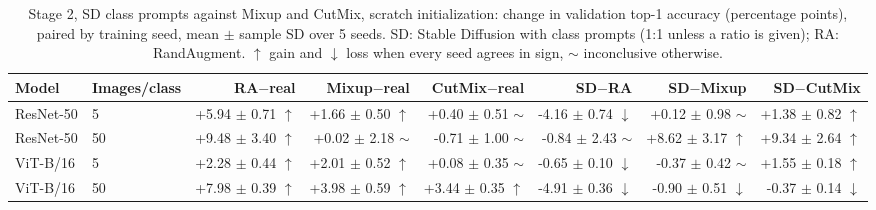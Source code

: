 \begin{table}[H]
\centering
\small
\setlength{\tabcolsep}{4pt}
\caption{Stage 2, SD class prompts against Mixup and CutMix, scratch initialization: change in validation top-1 accuracy (percentage points), paired by training seed, mean $\pm$ sample SD over 5 seeds. SD: Stable Diffusion with class prompts (1:1 unless a ratio is given); RA: RandAugment. $\uparrow$ gain and $\downarrow$ loss when every seed agrees in sign, $\sim$ inconclusive otherwise.}
\label{tab:stage2-mixing-scratch}
\begin{tabular}{llrrrrrr}
\toprule
Model & Images/class & RA$-$real & Mixup$-$real & CutMix$-$real & SD$-$RA & SD$-$Mixup & SD$-$CutMix \\
\midrule
ResNet-50 & 5 & +5.94 $\pm$ 0.71 $\uparrow$ & +1.66 $\pm$ 0.50 $\uparrow$ & +0.40 $\pm$ 0.51 $\sim$ & -4.16 $\pm$ 0.74 $\downarrow$ & +0.12 $\pm$ 0.98 $\sim$ & +1.38 $\pm$ 0.82 $\uparrow$ \\
ResNet-50 & 50 & +9.48 $\pm$ 3.40 $\uparrow$ & +0.02 $\pm$ 2.18 $\sim$ & -0.71 $\pm$ 1.00 $\sim$ & -0.84 $\pm$ 2.43 $\sim$ & +8.62 $\pm$ 3.17 $\uparrow$ & +9.34 $\pm$ 2.64 $\uparrow$ \\
\midrule
ViT-B/16 & 5 & +2.28 $\pm$ 0.44 $\uparrow$ & +2.01 $\pm$ 0.52 $\uparrow$ & +0.08 $\pm$ 0.35 $\sim$ & -0.65 $\pm$ 0.10 $\downarrow$ & -0.37 $\pm$ 0.42 $\sim$ & +1.55 $\pm$ 0.18 $\uparrow$ \\
ViT-B/16 & 50 & +7.98 $\pm$ 0.39 $\uparrow$ & +3.98 $\pm$ 0.59 $\uparrow$ & +3.44 $\pm$ 0.35 $\uparrow$ & -4.91 $\pm$ 0.36 $\downarrow$ & -0.90 $\pm$ 0.51 $\downarrow$ & -0.37 $\pm$ 0.14 $\downarrow$ \\
\bottomrule
\end{tabular}
\end{table}
